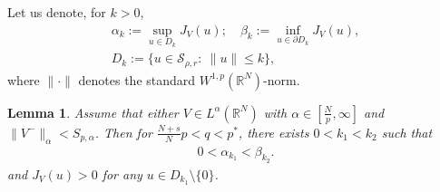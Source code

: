 \documentclass[11pt,reqno]{amsart}
\newtheorem{lemma}[theorem]{Lemma}
\theoremstyle{definition}
\numberwithin{equation}{section}
\numberwithin{theorem}{section}
\numberwithin{equation}{section}
\numberwithin{theorem}{section}
\newcommand{\rn}{\mathbb{R}^N}
\begin{document}
Let us denote, for $k>0$,
\begin{align}
\alpha_k:=\sup_{u\in D_k}J_V(u);\quad \beta_k:=\inf_{u\in \partial D_k}J_V(u),\\
D_k:= \{u\in \mathcal{S}_{\rho,r}:\  \|u\|\le k\},
\end{align}
where $\|\cdotp\|$ denotes the standard $W^{1,p}(\rn)$-norm.
\begin{lemma}
\label{lemma-MP}
Assume that either $V\in L^{\alpha}(\rn)$ with $\alpha\in[\frac{N}{p},\infty]$ and $\|V^-\|_{\alpha}<S_{p,\alpha}$. %
Then for $\frac{N+s}{N}p<q<p^*$, there exists $0<k_1<k_2$ such that
\begin{align}\label{eq:lev:1}
0<\alpha_{k_1}<\beta_{k_2}.
\end{align}
and $J_V(u)>0$ for any $u\in D_{k_1}\setminus\{0\}$.
\end{lemma}
\end{document}
